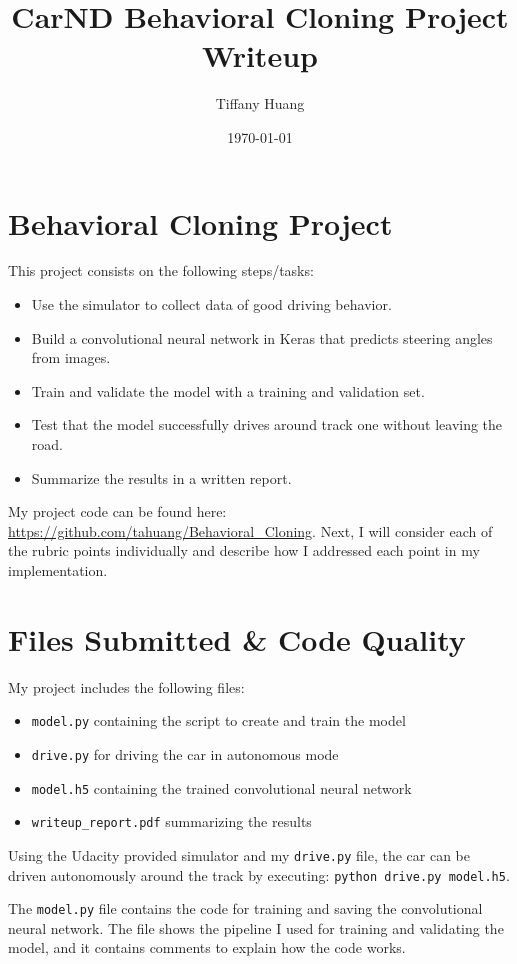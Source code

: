 \documentclass[12pt]{article}
\title{CarND Behavioral Cloning Project Writeup}
\author{Tiffany Huang}
\date{\today}
\begin{document}
\maketitle


\section{Behavioral Cloning Project}
This project consists on the following steps/tasks:
\begin{itemize}
\item {Use the simulator to collect data of good driving behavior.}
\item {Build a convolutional neural network in Keras that predicts steering angles from images.}
\item {Train and validate the model with a training and validation set.}
\item {Test that the model successfully drives around track one without leaving the road.}
\item {Summarize the results in a written report.}
\end{itemize}
My project code can be found here: \url{https://github.com/tahuang/Behavioral_Cloning}. Next, I will consider each of the rubric points individually and describe how I addressed each point in my implementation.

\section{Files Submitted \& Code Quality}
My project includes the following files:
\begin{itemize}
\item {\texttt{model.py} containing the script to create and train the model}
\item {\texttt{drive.py} for driving the car in autonomous mode}
\item {\texttt{model.h5} containing the trained convolutional neural network}
\item {\texttt{writeup\_report.pdf} summarizing the results}
\end{itemize}

Using the Udacity provided simulator and my \texttt{drive.py} file, the car can be driven autonomously around the track by executing: \texttt{python drive.py model.h5}.

The \texttt{model.py} file contains the code for training and saving the convolutional neural network. The file shows the pipeline I used for training and validating the model, and it contains comments to explain how the code works.
\end{document}
